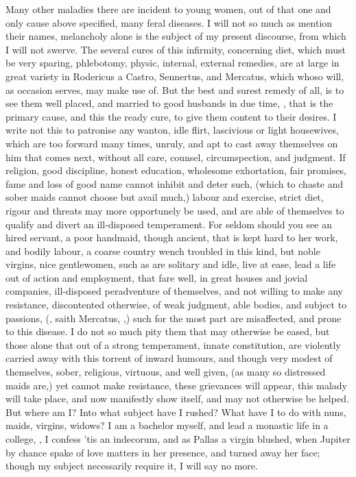 {Many other maladies there are incident to young women, out of that one and only
cause above specified, many feral diseases. I will not so much as mention their
names, melancholy alone is the subject of my present discourse, from which I
will not swerve. The several cures of this infirmity, concerning diet, which
must be very sparing, phlebotomy, physic, internal, external remedies, are at
large in great variety in Rodericus a Castro, Sennertus,
and Mercatus, which whoso will, as occasion serves, may make use of. But the
best and surest remedy of all, is to see them well placed, and married to good
husbands in due time, , that is the primary cause,
and this the ready cure, to give them content to their desires. I write not
this to patronise any wanton, idle flirt, lascivious or light housewives, which
are too forward many times, unruly, and apt to cast away themselves on him that
comes next, without all care, counsel, circumspection, and judgment. If
religion, good discipline, honest education, wholesome exhortation, fair
promises, fame and loss of good name cannot inhibit and deter such, (which to
chaste and sober maids cannot choose but avail much,) labour and exercise,
strict diet, rigour and threats may more opportunely be used, and are able of
themselves to qualify and divert an ill-disposed temperament. For seldom should
you see an hired servant, a poor handmaid, though ancient, that is kept hard to
her work, and bodily labour, a coarse country wench troubled in this kind, but
noble virgins, nice gentlewomen, such as are solitary and idle, live at ease,
lead a life out of action and employment, that fare well, in great houses and
jovial companies, ill-disposed peradventure of themselves, and not willing to
make any resistance, discontented otherwise, of weak judgment, able bodies, and
subject to passions, (, saith Mercatus, ,) such for the most part are misaffected, and
prone to this disease. I do not so much pity them that may otherwise be eased,
but those alone that out of a strong temperament, innate constitution, are
violently carried away with this torrent of inward humours, and though very
modest of themselves, sober, religious, virtuous, and well given, (as many so
distressed maids are,) yet cannot make resistance, these grievances will
appear, this malady will take place, and now manifestly show itself, and may
not otherwise be helped. But where am I? Into what subject have I rushed? What
have I to do with nuns, maids, virgins, widows? I am a bachelor myself, and
lead a monastic life in a college, ,%
I confess 'tis an indecorum, and as Pallas a virgin blushed, when Jupiter by
chance spake of love matters in her presence, and turned away her face;  though my subject necessarily require it, I will say no more.

}
